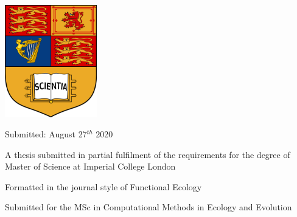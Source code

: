 \begin{titlepage}
	\vspace*{2\baselineskip} %
	
	
	
%	
%	
%	
%	
%	
%	
	

	
	
	\includegraphics[width = 4cm, keepaspectratio]{../images/IC_crest.pdf}
	
	\vspace{0.3\baselineskip} %
	
	Submitted: August 27$^{th}$ 2020 %
	
	

	\vspace{0.5\baselineskip}
	
	A thesis submitted in partial fulfilment of the requirements for the degree of
	Master of Science at Imperial College London
	\vspace{0.5\baselineskip}
	
	Formatted in the journal style of Functional Ecology	
	\vspace{0.5\baselineskip}
	
	Submitted for the MSc in Computational Methods in Ecology and Evolution
	
\end{titlepage}

